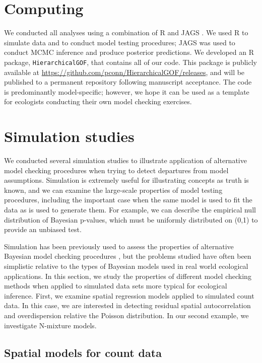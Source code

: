 \documentclass[12pt,english]{article}
\begin{document}
\begin{spacing}{1.9}
\section{Computing}

We conducted all analyses using a combination of R \citep{RTeam2015} and JAGS \citep{Plummer2003}.  We used R to simulate data and to conduct model testing procedures; JAGS was used to conduct MCMC inference and produce posterior predictions. We developed an R package, \texttt{HierarchicalGOF}, that contains all of our code.  This package is publicly available at \url{https://github.com/pconn/HierarchicalGOF/releases}, and will be published to a permanent repository following manuscript acceptance. The code is predominantly model-specific; however, we hope it can be used as a template for ecologists conducting their own model checking exercises.

\section{Simulation studies}

We conducted several simulation studies to illustrate application of alternative model checking procedures when trying to detect departures from model assumptions.  Simulation is extremely useful for illustrating concepts as truth is known, and we can examine the large-scale properties of model testing procedures, including the important case when the same model is used to fit the data as is used to generate them.  For example, we can describe the empirical null distribution of Bayesian p-values, which must be uniformly distributed on (0,1) to provide an unbiased test.

Simulation has been previously used to assess the properties of alternative Bayesian model checking procedures \citep[e.g.,][]{Gosselin2011,YuanJohnson2012,Zhang2014}, but the problems studied have often been simplistic relative to the types of Bayesian models used in real world ecological applications.  In this section, we study the properties of different model checking methods when applied to simulated data sets more typical for ecological inference.
First, we examine spatial regression models applied to simulated count data.  In this case, we are interested in detecting residual spatial autocorrelation and overdispersion relative the Poisson distribution.  In our second example, we investigate N-mixture models.

\subsection{Spatial models for count data}


\end{spacing}
\end{document}

